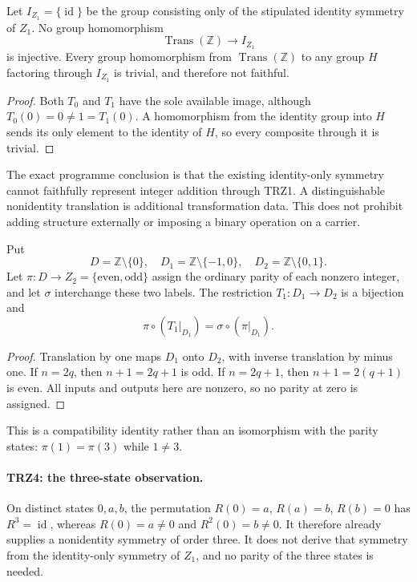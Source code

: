 \begin{theorem}
Let $I_{Z_1}=\{\operatorname{id}\}$ be the group consisting only of the stipulated identity symmetry of $Z_1$. No group homomorphism
\[
\operatorname{Trans}(\mathbb Z)\longrightarrow I_{Z_1}
\]
is injective. Every group homomorphism from $\operatorname{Trans}(\mathbb Z)$ to any group $H$ factoring through $I_{Z_1}$ is trivial, and therefore not faithful.
\end{theorem}
\begin{proof}
Both $T_0$ and $T_1$ have the sole available image, although $T_0(0)=0\ne1=T_1(0)$. A homomorphism from the identity group into $H$ sends its only element to the identity of $H$, so every composite through it is trivial.
\end{proof}
The exact programme conclusion is that the existing identity-only symmetry cannot faithfully represent integer addition through TRZ1. A distinguishable nonidentity translation is additional transformation data. This does not prohibit adding structure externally or imposing a binary operation on a carrier.

\begin{theorem}
Put
\[
D=\mathbb Z\setminus\{0\},\quad
D_1=\mathbb Z\setminus\{-1,0\},\quad
D_2=\mathbb Z\setminus\{0,1\}.
\]
Let $\pi:D\to Z_2=\{\mathrm{even},\mathrm{odd}\}$ assign the ordinary parity of each nonzero integer, and let $\sigma$ interchange these two labels. The restriction $T_1:D_1\to D_2$ is a bijection and
\[
\pi\circ(T_1|_{D_1})=\sigma\circ(\pi|_{D_1}).
\]
\end{theorem}
\begin{proof}
Translation by one maps $D_1$ onto $D_2$, with inverse translation by minus one. If $n=2q$, then $n+1=2q+1$ is odd. If $n=2q+1$, then $n+1=2(q+1)$ is even. All inputs and outputs here are nonzero, so no parity at zero is assigned.
\end{proof}
This is a compatibility identity rather than an isomorphism with the parity states: $\pi(1)=\pi(3)$ while $1\ne3$.

\paragraph{TRZ4: the three-state observation.}
On distinct states $0,a,b$, the permutation $R(0)=a$, $R(a)=b$, $R(b)=0$ has $R^3=\operatorname{id}$, whereas $R(0)=a\ne0$ and $R^2(0)=b\ne0$. It therefore already supplies a nonidentity symmetry of order three. It does not derive that symmetry from the identity-only symmetry of $Z_1$, and no parity of the three states is needed.

